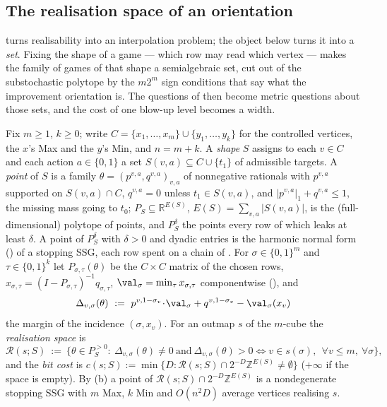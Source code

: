
\subsection{The realisation space of an orientation}\label{rs:sec}

 turns realisability into an interpolation
problem; the object below turns it into a \emph{set}. Fixing the shape of a
game --- which row may read which vertex --- makes the family of games of that
shape a semialgebraic set, cut out of the substochastic polytope by the
$m2^{m}$ sign conditions that say what the improvement orientation is. The
questions of  then become metric questions about
those sets, and the cost of one blow-up level becomes a width.

\begin{definition}\label{rs:def-space}
Fix $m\ge1$, $k\ge0$; write $C=\{x_1,\dots,x_m\}\cup\{y_1,\dots,y_k\}$ for the
controlled vertices, the $x$'s Max and the $y$'s Min, and $n=m+k$. A
\emph{shape} $S$ assigns to each $v\in C$ and each action $a\in\{0,1\}$ a set
$S(v,a)\subseteq C\cup\{t_1\}$ of admissible targets. A \emph{point} of $S$ is
a family $\theta=(p^{v,a},q^{v,a})_{v,a}$ of nonnegative rationals with
$p^{v,a}$ supported on $S(v,a)\cap C$, $q^{v,a}=0$ unless $t_1\in S(v,a)$, and
$|p^{v,a}|_{1}+q^{v,a}\le1$, the missing mass going to $t_0$; $P_S\subseteq
\mathbb R^{E(S)}$, $E(S)=\sum_{v,a}|S(v,a)|$, is the (full-dimensional)
polytope of points, and $P_S^{\delta}$ the points every row of which leaks at
least $\delta$. A point of $P_S^{\delta}$ with $\delta>0$ and dyadic entries is
the harmonic normal form () of a stopping SSG, each row
spent on a chain of . For $\sigma\in\{0,1\}^{m}$ and
$\tau\in\{0,1\}^{k}$ let $P_{\sigma,\tau}(\theta)$ be the $C\times C$ matrix of
the chosen rows, $x_{\sigma,\tau}=(I-P_{\sigma,\tau})^{-1}q_{\sigma,\tau}$,
$\val_\sigma=\min_{\tau}x_{\sigma,\tau}$ componentwise
(), and
\[
 \Delta_{v,\sigma}(\theta)\ :=\ p^{v,1-\sigma_v}\!\cdot\!\val_\sigma
   +q^{v,1-\sigma_v}-\val_\sigma(x_v)
\]
the margin of the incidence $(\sigma,x_v)$. For an outmap $s$ of the
$m$-cube the \emph{realisation space} is
\[
 \mathcal R(s;S)\ :=\ \bigl\{\theta\in P_S^{>0}:\
   \Delta_{v,\sigma}(\theta)\ne0\ \text{and}\
   \Delta_{v,\sigma}(\theta)>0\iff v\in s(\sigma),\ \ \forall v\le m,\ \forall\sigma\bigr\},
\]
and the \emph{bit cost} is
$c(s;S):=\min\{D:\mathcal R(s;S)\cap2^{-D}\mathbb Z^{E(S)}\ne\emptyset\}$
($+\infty$ if the space is empty). By (b) a point of
$\mathcal R(s;S)\cap2^{-D}\mathbb Z^{E(S)}$ is a nondegenerate stopping SSG
with $m$ Max, $k$ Min and $O(n^{2}D)$ average vertices realising $s$.
\end{definition}

